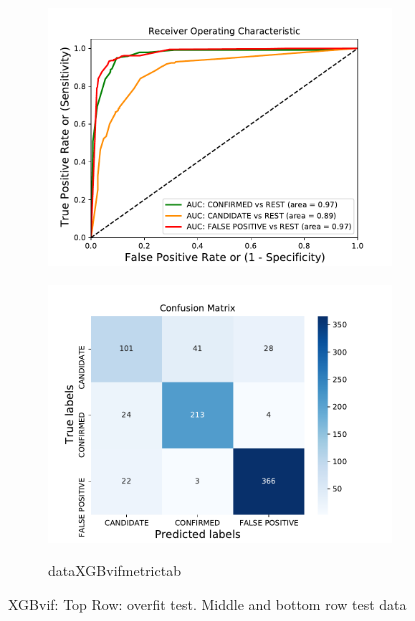 \begin{figure}[H]
\begin{subfigure}{.49\textwidth}
                \includegraphics[width = 1\textwidth]{data/XGB_vif_roc.pdf}
                \end{subfigure}
                \begin{subfigure}{.49\textwidth}
                \includegraphics[width = 1\textwidth]{data/XGB_vif_cm.pdf}
                \end{subfigure}
                \begin{subfigure}{1\textwidth}
                \csname dataXGBvifmetrictab\endcsname
                \end{subfigure}
                \caption{XGBvif: Top Row: overfit test. Middle and bottom row test data}
                \label{fig:data/XGB_vif_roc}
                \end{figure}